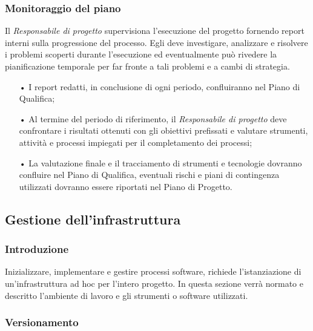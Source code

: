 \subsubsection{Monitoraggio del piano}
Il \textit{Responsabile di progetto} supervisiona l'esecuzione del progetto fornendo report interni sulla progressione del processo. 
\newline
Egli deve investigare, analizzare e risolvere i problemi scoperti durante l'esecuzione ed eventualmente può rivedere la pianificazione temporale per far fronte a tali problemi e a cambi di strategia.
\begin{itemize}
\item[•] I report redatti, in conclusione di ogni periodo, confluiranno nel Piano di Qualifica;
\item[•] Al termine del periodo di riferimento, il \textit{Responsabile di progetto} deve confrontare i risultati ottenuti con gli obiettivi prefissati e valutare strumenti, attività e processi impiegati per il completamento dei processi;
\item[•] La valutazione finale e il tracciamento di strumenti e tecnologie dovranno confluire nel Piano di Qualifica, eventuali rischi e piani di contingenza utilizzati dovranno essere riportati nel Piano di Progetto.
\end{itemize}

\subsection{Gestione dell'infrastruttura}

\subsubsection{Introduzione}
Inizializzare, implementare e gestire processi software, richiede l’istanziazione di un’infrastruttura ad hoc per l'intero progetto. In questa sezione verrà normato e descritto l'ambiente di lavoro e gli strumenti o software utilizzati.

\subsubsection{Versionamento}

